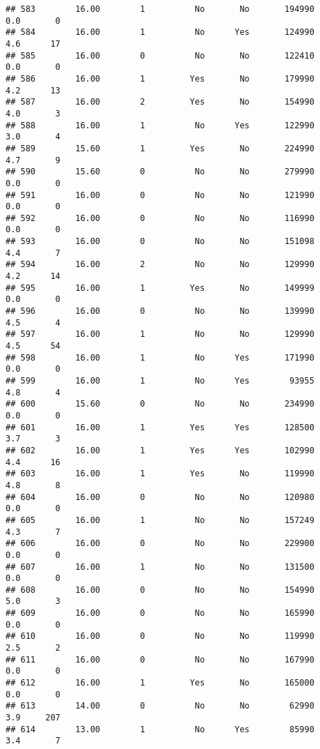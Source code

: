\documentclass[
]{article}
\begin{document}
\begin{verbatim}
## 583        16.00        1          No       No       194990         0.0       0
## 584        16.00        1          No      Yes       124990         4.6      17
## 585        16.00        0          No       No       122410         0.0       0
## 586        16.00        1         Yes       No       179990         4.2      13
## 587        16.00        2         Yes       No       154990         4.0       3
## 588        16.00        1          No      Yes       122990         3.0       4
## 589        15.60        1         Yes       No       224990         4.7       9
## 590        15.60        0          No       No       279990         0.0       0
## 591        16.00        0          No       No       121990         0.0       0
## 592        16.00        0          No       No       116990         0.0       0
## 593        16.00        0          No       No       151098         4.4       7
## 594        16.00        2          No       No       129990         4.2      14
## 595        16.00        1         Yes       No       149999         0.0       0
## 596        16.00        0          No       No       139990         4.5       4
## 597        16.00        1          No       No       129990         4.5      54
## 598        16.00        1          No      Yes       171990         0.0       0
## 599        16.00        1          No      Yes        93955         4.8       4
## 600        15.60        0          No       No       234990         0.0       0
## 601        16.00        1         Yes      Yes       128500         3.7       3
## 602        16.00        1         Yes      Yes       102990         4.4      16
## 603        16.00        1         Yes       No       119990         4.8       8
## 604        16.00        0          No       No       120980         0.0       0
## 605        16.00        1          No       No       157249         4.3       7
## 606        16.00        0          No       No       229900         0.0       0
## 607        16.00        1          No       No       131500         0.0       0
## 608        16.00        0          No       No       154990         5.0       3
## 609        16.00        0          No       No       165990         0.0       0
## 610        16.00        0          No       No       119990         2.5       2
## 611        16.00        0          No       No       167990         0.0       0
## 612        16.00        1         Yes       No       165000         0.0       0
## 613        14.00        0          No       No        62990         3.9     207
## 614        13.00        1          No      Yes        85990         3.4       7

\end{verbatim}
\end{document}
